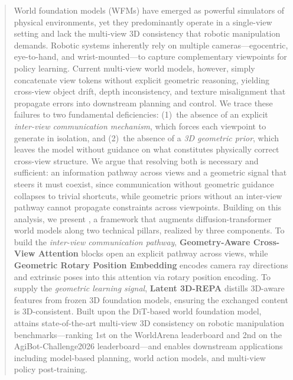 \begin{abstract}
World foundation models (WFMs) have emerged as powerful simulators of physical environments, yet they predominantly operate in a single-view setting and lack the multi-view 3D consistency that robotic manipulation demands. Robotic systems inherently rely on multiple cameras---egocentric, eye-to-hand, and wrist-mounted---to capture complementary viewpoints for policy learning. Current multi-view world models, however, simply concatenate view tokens without explicit geometric reasoning, yielding cross-view object drift, depth inconsistency, and texture misalignment that propagate errors into downstream planning and control. We trace these failures to two fundamental deficiencies: (1)~the absence of an explicit \emph{inter-view communication mechanism}, which forces each viewpoint to generate in isolation, and (2)~the absence of a \emph{3D geometric prior}, which leaves the model without guidance on what constitutes physically correct cross-view structure. We argue that resolving both is necessary and sufficient: an information pathway across views and a geometric signal that steers it must coexist, since communication without geometric guidance collapses to trivial shortcuts, while geometric priors without an inter-view pathway cannot propagate constraints across viewpoints. Building on this analysis, we present \textbf{\methodname{}}, a framework that augments diffusion-transformer world models along two technical pillars, realized by three components. To build the \emph{inter-view communication pathway}, \textbf{Geometry-Aware Cross-View Attention} blocks open an explicit pathway across views, while \textbf{Geometric Rotary Position Embedding} encodes camera ray directions and extrinsic poses into this attention via rotary position encoding. To supply the \emph{geometric learning signal}, \textbf{Latent 3D-REPA} distills 3D-aware features from frozen 3D foundation models, ensuring the exchanged content is 3D-consistent. Built upon the DiT-based world foundation model, \methodname{} attains state-of-the-art multi-view 3D consistency on robotic manipulation benchmarks---ranking 1st on the WorldArena leaderboard and 2nd on the AgiBot-Challenge2026 leaderboard---and enables downstream applications including model-based planning, world action models, and multi-view policy post-training.
\end{abstract}
